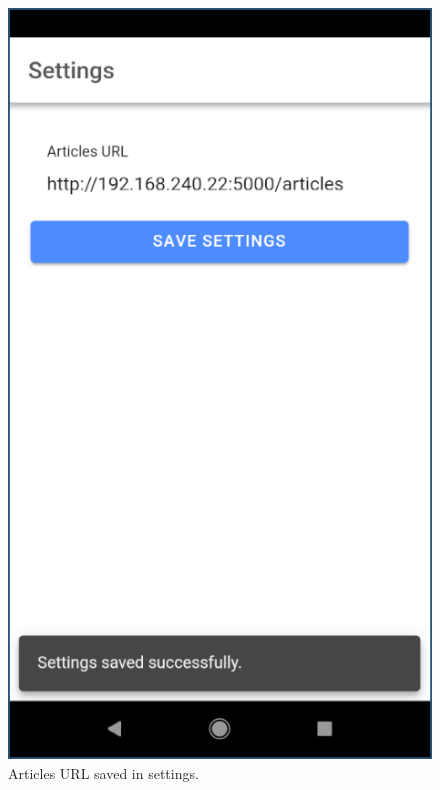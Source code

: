 \documentclass[12pt]{report}
\begin{document}
\begin{figure}
    \centering
    \includegraphics[scale=0.5]{images/avd-settings-saved.png}
    \caption{Articles URL saved in settings.}
    \label{fig:avd-settings-saved}
\end{figure}
\end{document}
